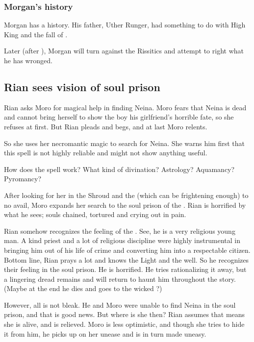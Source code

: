 \begin{garbage}
\subsubsection{Morgan's history}
Morgan has a history. His father, Uther Runger, had something to do with High King \LastHighKing{} and the fall of \hs{\GreatBelkade}. 

Later (after \emph{\RungerWarBook}), Morgan will turn against the Rissitics and attempt to right what he has wronged. 










\subsection{Rian sees vision of soul prison}
Rian asks Moro \Cornel{} for magical help in finding Neina. Moro fears that Neina is dead and cannot bring herself to show the boy his girlfriend's horrible fate, so she refuses at first. But Rian pleads and begs, and at last Moro relents. 

So she uses her necromantic magic to search for Neina. She warns him first that this spell is not highly reliable and might not show anything useful. 

How does the spell work? What kind of divination? Astrology? Aquamancy? Pyromancy? 

After looking for her in the Shroud and the \Wylde{} (which can be frightening enough) to no avail, Moro expands her search to the soul prison of the \Sephiroth{}. Rian is horrified by what he sees; souls chained, tortured and crying out in pain. 

Rian somehow recognizes the feeling of the \Sephiroth. See, he is a very religious young man. A kind priest and a lot of religious discipline were highly instrumental in bringing him out of his life of crime and converting him into a respectable citizen. Bottom line, Rian prays a lot and knows the Light and the \Sephiroth{} well. So he recognizes their feeling in the soul prison. He is horrified. He tries rationalizing it away, but a lingering dread remains and will return to haunt him throughout the story. (Maybe at the end he dies and goes to the wicked \Sephiroth?) 

However, all is not bleak. He and Moro were unable to find Neina in the soul prison, and that is good news. But where is she then? Rian assumes that means she is alive, and is relieved. Moro is less optimistic, and though she tries to hide it from him, he picks up on her unease and is in turn made uneasy. 


\end{garbage}
